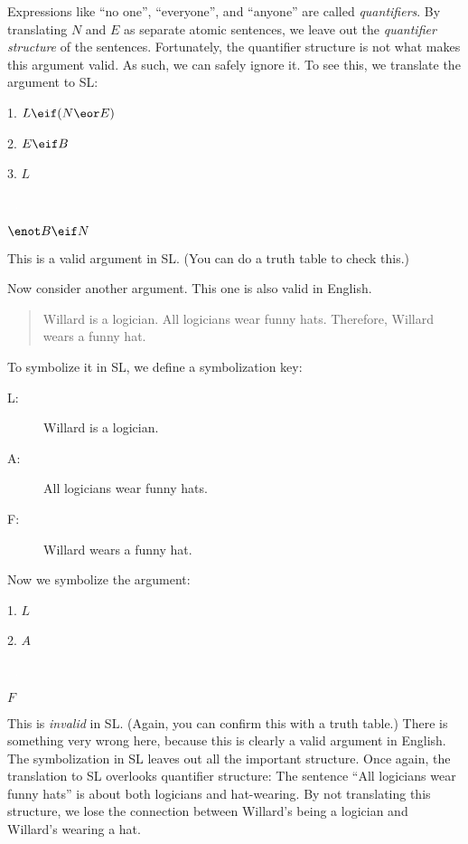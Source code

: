 Expressions like ``no one'', ``everyone'', and ``anyone'' are called \emph{quantifiers}. By translating $N$ and $E$ as separate atomic sentences, we leave out the \emph{quantifier structure} of the sentences. Fortunately, the quantifier structure is not what makes this argument valid. As such, we can safely ignore it. To see this, we translate the argument to SL:

\begin{kormanize}
\item[1.]$L \eif (N \eor E)$
\item[2.]$E \eif B$
\item[3.]$L$
\item[] \textcolor{white}{.}\sout{\hspace{.2\linewidth}} \textcolor{white}{.}
\item[\therefore]$\enot B \eif N$
\end{kormanize}

This is a valid argument in SL. (You can do a truth table to check this.) 


Now consider another argument. This one is also valid in English.

\begin{quote}
\label{willard1}
Willard is a logician. All logicians wear funny hats. Therefore, Willard wears a funny hat.
\end{quote}

To symbolize it in SL, we define a symbolization key:
\begin{description}
\item[L:] Willard is a logician.
\item[A:] All logicians wear funny hats.
\item[F:] Willard wears a funny hat.
\end{description}

Now we symbolize the argument:
\begin{kormanize}
\item[1.]$L$
\item[2.]$A$
\item[] \textcolor{white}{.}\sout{\hspace{.05\linewidth}} \textcolor{white}{.}
\item[\therefore] $F$
\end{kormanize}

This is \emph{invalid} in SL. (Again, you can confirm this with a truth table.) There is something very wrong here, because this is clearly a valid argument in English. The symbolization in SL leaves out all the important structure. Once again, the translation to SL overlooks quantifier structure: The sentence ``All logicians wear funny hats'' is about both logicians and hat-wearing. By not translating this structure, we lose the connection between Willard's being a logician and Willard's wearing a hat.

